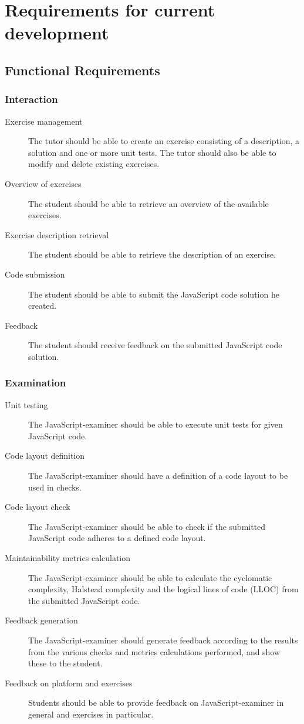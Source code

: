 
\section{Requirements for current development}
\subsection{Functional Requirements}
\subsubsection{Interaction}
\begin{description}
  \item[Exercise management] The tutor should be able to create an exercise
    consisting of a description, a solution and one or more unit tests. The
    tutor should also be able to modify and delete existing exercises.
  \item[Overview of exercises] The student should be able to retrieve an
    overview of the available exercises.
  \item[Exercise description retrieval] The student should be able to retrieve
    the description of an exercise.
  \item[Code submission] The student should be able to submit the JavaScript
    code solution he created.
  \item[Feedback] The student should receive feedback on the submitted
    JavaScript code solution.
\end{description}

\subsubsection{Examination}
\begin{description}
  \item[Unit testing] The JavaScript-examiner should be able to execute unit 
    tests for given JavaScript code.
  \item[Code layout definition] The JavaScript-examiner should have a
    definition of a code layout to be used in \glspl{check}.
  \item[Code layout check] The JavaScript-examiner should be able to check if 
    the submitted JavaScript code adheres to a defined code layout.
  \item[Maintainability metrics calculation] The JavaScript-examiner should be 
    able to calculate the cyclomatic complexity, Halstead complexity and the 
    logical lines of code (LLOC) from the submitted JavaScript code.
  \item[Feedback generation] The JavaScript-examiner should generate feedback
    according to the results from the various \glspl{check} and metrics calculations
    performed, and show these to the student.
  \item[Feedback on platform and exercises] Students should be able to provide
    feedback on JavaScript-examiner in general and exercises in particular.
\end{description}

